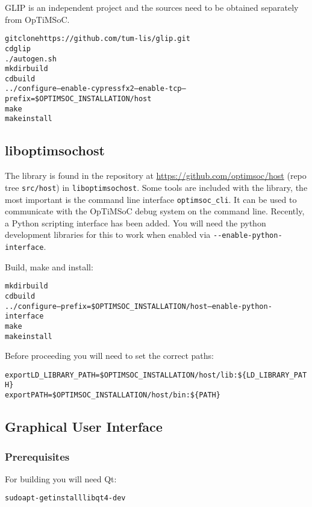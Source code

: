 GLIP is an independent project and the sources need to be obtained separately
from OpTiMSoC.

\begin{alltt}
git clone https://github.com/tum-lis/glip.git
cd glip
./autogen.sh
mkdir build
cd build
../configure --enable-cypressfx2 --enable-tcp --prefix=\$OPTIMSOC_INSTALLATION/host
make
make install
\end{alltt}

\subsection{liboptimsochost}

The library is found in the repository at
\url{https://github.com/optimsoc/host} (repo tree \verb|src/host|) in
\verb|liboptimsochost|.  Some tools are included with the library, the
most important is the command line interface \verb|optimsoc_cli|. It
can be used to communicate with the OpTiMSoC debug system on the
command line. Recently, a Python scripting interface has been
added. You will need the python development libraries for this to work
when enabled via \verb|--enable-python-interface|.

Build, make and install:

\begin{alltt}
mkdir build
cd build
../configure --prefix=\$OPTIMSOC_INSTALLATION/host --enable-python-interface
make
make install
\end{alltt}

Before proceeding you will need to set the correct paths:

\begin{alltt}
export LD_LIBRARY_PATH=\$OPTIMSOC_INSTALLATION/host/lib:\$\{LD_LIBRARY_PATH\}
export PATH=\$OPTIMSOC_INSTALLATION/host/bin:\$\{PATH\}
\end{alltt}

\subsection{Graphical User Interface}

\subsubsection{Prerequisites}

For building you will need Qt:

\begin{alltt}
sudo apt-get install libqt4-dev
\end{alltt}


